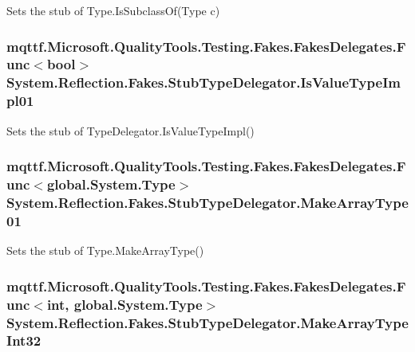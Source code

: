 Sets the stub of Type.\-Is\-Subclass\-Of(\-Type c)

\hypertarget{class_system_1_1_reflection_1_1_fakes_1_1_stub_type_delegator_afe2432c06c1ecd3dc8f79b1c3e0975ae}{
\subsubsection[{Is\-Value\-Type\-Impl01}]{\setlength{\rightskip}{0pt plus 5cm}mqttf.\-Microsoft.\-Quality\-Tools.\-Testing.\-Fakes.\-Fakes\-Delegates.\-Func$<$bool$>$ System.\-Reflection.\-Fakes.\-Stub\-Type\-Delegator.\-Is\-Value\-Type\-Impl01}}\label{class_system_1_1_reflection_1_1_fakes_1_1_stub_type_delegator_afe2432c06c1ecd3dc8f79b1c3e0975ae}


Sets the stub of Type\-Delegator.\-Is\-Value\-Type\-Impl()

\hypertarget{class_system_1_1_reflection_1_1_fakes_1_1_stub_type_delegator_afa2047ab4e96e11ecffc850f48543975}{
\subsubsection[{Make\-Array\-Type01}]{\setlength{\rightskip}{0pt plus 5cm}mqttf.\-Microsoft.\-Quality\-Tools.\-Testing.\-Fakes.\-Fakes\-Delegates.\-Func$<$global.\-System.\-Type$>$ System.\-Reflection.\-Fakes.\-Stub\-Type\-Delegator.\-Make\-Array\-Type01}}\label{class_system_1_1_reflection_1_1_fakes_1_1_stub_type_delegator_afa2047ab4e96e11ecffc850f48543975}


Sets the stub of Type.\-Make\-Array\-Type()

\hypertarget{class_system_1_1_reflection_1_1_fakes_1_1_stub_type_delegator_ac13504081be1e6bb783fbb69d6107b10}{
\subsubsection[{Make\-Array\-Type\-Int32}]{\setlength{\rightskip}{0pt plus 5cm}mqttf.\-Microsoft.\-Quality\-Tools.\-Testing.\-Fakes.\-Fakes\-Delegates.\-Func$<$int, global.\-System.\-Type$>$ System.\-Reflection.\-Fakes.\-Stub\-Type\-Delegator.\-Make\-Array\-Type\-Int32}}\label{class_system_1_1_reflection_1_1_fakes_1_1_stub_type_delegator_ac13504081be1e6bb783fbb69d6107b10}


